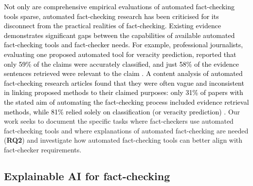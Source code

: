 \textcolor{black}{Not only are comprehensive empirical evaluations of automated fact-checking tools sparse, automated fact-checking research has been criticised for its disconnect from the practical realities of fact-checking. Existing evidence demonstrates significant gaps between the capabilities of available automated fact-checking tools and fact-checker needs.
For example, professional journalists, evaluating one proposed automated tool for veracity prediction, reported that only 59\% of the claims were accurately classified, and just 58\% of the evidence sentences retrieved were relevant to the claim \cite{miranda2019automated}.
A content analysis of automated fact-checking research articles found that they were often vague and inconsistent in linking proposed methods to their claimed purposes: only 31\% of papers with the stated aim of automating the fact-checking process included evidence retrieval methods, while 81\% relied solely on classification (or veracity prediction)  \cite{schlichtkrull2023usesfactchecking}.
}
Our work seeks to document the specific tasks where fact-checkers use automated fact-checking tools and where explanations of automated fact-checking are needed (\textbf{RQ2}) and investigate how automated fact-checking tools can better align with fact-checker requirements.




\subsection{Explainable AI for fact-checking} \label{relwork:explainableAI}

